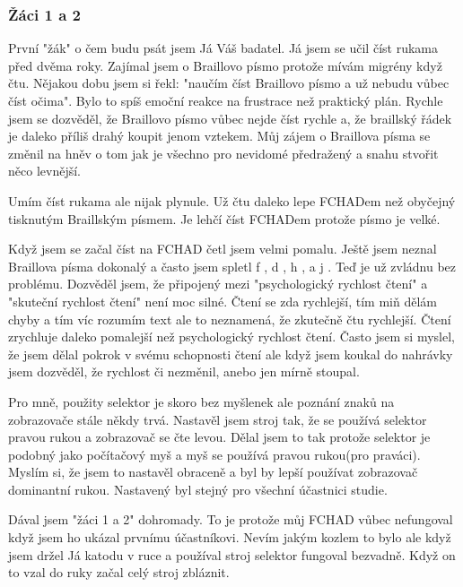 \subsubsection{Žáci 1 a 2}

První "žák" o čem budu psát jsem Já Váš badatel.  Já jsem se učil číst rukama před dvěma roky. Zajímal jsem o Braillovo písmo protože mívám migrény když čtu.  Nějakou dobu jsem si řekl: "naučím číst Braillovo písmo a už nebudu vůbec číst očima".  Bylo to spíš emoční reakce na frustrace než praktický plán.  Rychle jsem se dozvěděl, že Braillovo písmo vůbec nejde číst rychle a, že braillský řádek je daleko příliš drahý koupit jenom vztekem.  Můj zájem o Braillova písma se změnil na hněv o tom jak je všechno pro nevidomé předražený a snahu stvořit něco levnější.

Umím číst rukama ale nijak plynule.  Už čtu daleko lepe FCHADem než obyčejný tisknutým Braillským písmem.  Je lehčí číst FCHADem protože písmo je velké.

Když jsem se začal číst na FCHAD četl jsem velmi pomalu.  Ještě jsem neznal Braillova písma dokonalý a často jsem spletl f , d , h , a j . Teď je už zvládnu bez problému.  Dozvěděl jsem, že připojený mezi "psychologický rychlost čtení" a "skuteční rychlost čtení" není moc silné.  Čtení se zda rychlejší, tím miň dělám chyby a tím víc rozumím text ale to neznamená, že zkutečně čtu rychlejší.  Čtení zrychluje daleko pomalejší než psychologický rychlost čtení.  Často jsem si myslel, že jsem dělal pokrok v svému schopnosti čtení ale když jsem koukal do nahrávky jsem dozvěděl, že rychlost či nezměnil, anebo jen mírně stoupal.

Pro mně, použity selektor je skoro bez myšlenek ale poznání znaků na zobrazovače stále někdy trvá.  Nastavěl jsem stroj tak, že se používá selektor pravou rukou a zobrazovač se čte levou. Dělal jsem to tak protože selektor je podobný jako počítačový myš a myš se používá pravou rukou(pro praváci).  Myslím si, že jsem to nastavěl obraceně a byl by lepší používat zobrazovač dominantní rukou.  Nastavený byl stejný pro všechní účastnici studie.

Dával jsem "žáci 1 a 2" dohromady.  To je protože můj FCHAD vůbec nefungoval když jsem ho ukázal prvnímu účastníkovi. Nevím jakým kozlem to bylo ale když jsem držel Já katodu v ruce a používal stroj selektor fungoval bezvadně. Když on to vzal do ruky začal celý stroj zbláznit.



